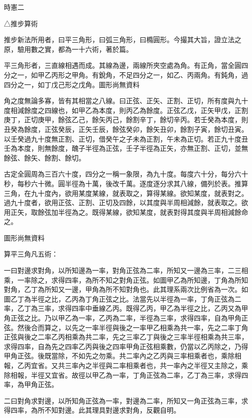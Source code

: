 
\begin{pinyinscope}
時憲二

△推步算術

推步新法所用者，曰平三角形，曰弧三角形，曰橢圓形。今撮其大旨，證立法之原，驗用數之實，都為一十六術，著於篇。

平三角形者，三直線相遇而成。其線為邊，兩線所夾空處為角。有正角，當全圓四分之一，如甲乙丙形之甲角。有銳角，不足四分之一，如乙、丙兩角。有鈍角，過四分之一，如丁戊己形之戊角。圖形尚無資料

角之度無論多寡，皆有其相當之八線。曰正弦、正矢、正割、正切，所有度與九十度相減餘度之四線也，如甲乙為本度，則丙乙為餘度。正弦乙戊，正矢甲戊，正割庚丁，正切庚甲，餘弦乙己，餘矢丙己，餘割辛丁，餘切辛丙。若壬癸為本度，則丑癸為餘度，正弦癸辰，正矢壬辰，餘弦癸卯，餘矢丑卯，餘割子寅，餘切丑寅。以壬癸過九十度無正割、正切，借癸午之子未為正割，午未為正切。若正九十度丑壬為本度，則無餘度，醜子半徑為正弦，壬子半徑為正矢，亦無正割、正切，並無餘弦、餘矢、餘割、餘切。

古定全圓周為三百六十度，四分之一稱一象限，為九十度。每度六十分，每分六十秒，每秒六十微。圓半徑為十萬，後改千萬。逐度逐分求其八線，備列於表。推算三角，在九十度內，欲用某度某線，就表取之，算得某線。欲知某度，就表對之。過九十度者，欲用正弦、正割、正切及四餘，以其度與半周相減餘，就表取之。欲用正矢，取餘弦加半徑為之。既得某線，欲知某度，就表對得其度與半周相減餘命之。

圖形尚無資料

算平三角凡五術：

一曰對邊求對角，以所知邊為一率，對角正弦為二率，所知又一邊為三率，二三相乘，一率除之，求得四率，為所不知之對角正弦。如圖甲乙為所知邊，丁角為所知對角，乙丁為所知又一邊，甲角為所不知對角也。此其理系兩次比例省為一次。如圖乙丁為半徑之比，乙丙為丁角正弦之比。法當先以半徑為一率，丁角正弦為二率，乙丁為三率，求得四率中垂線乙丙。既得乙丙，甲乙為半徑之比，乙丙又為甲角正弦之比。乃以甲乙為一率，乙丙為二率，半徑為三率，求得四率，自為甲角正弦。然後合而算之，以先之一率半徑與後之一率甲乙相乘為共一率，先之二率丁角正弦與後之二率乙丙相乘為共二率，先之三率乙丁與後之三率半徑相乘為共三率，求得四率，自為先之四率乙丙與後之四率甲角正弦相乘數，仍當以乙丙除之，乃得甲角正弦。後既當除，不如先之勿乘。共二率內之乙丙與三率相乘者也，乘除相報，乙丙宜省。又共三率內之半徑與二率相乘者也，共一率內之半徑又主除之，乘除相報，半徑又宜省。故徑以甲乙為一率，丁角正弦為二率，乙丁為三率，求得四率，為甲角正弦。

二曰對角求對邊，以所知角正弦為一率，對邊為二率，所知又一角正弦為三率，求得四率，為所不知對邊。此其理具對邊求對角，反觀自明。


\end{pinyinscope}

